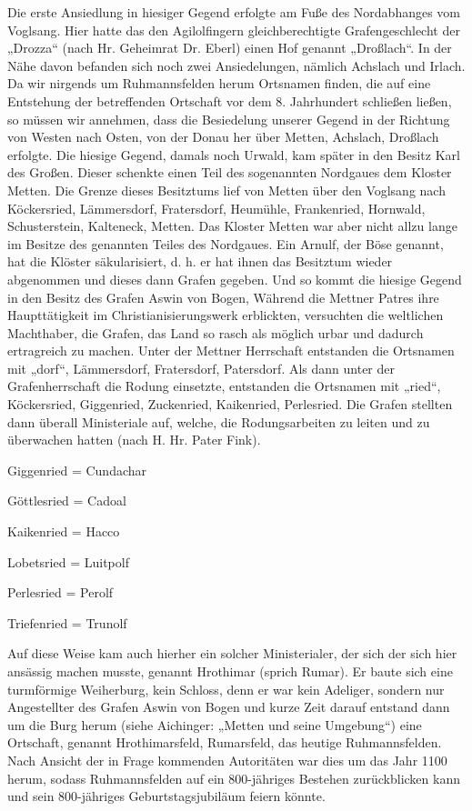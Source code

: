 \documentclass[12pt,a4paper]{book}
\begin{document}
Die erste Ansiedlung in hiesiger Gegend erfolgte am Fuße des Nordabhanges vom
Voglsang. Hier hatte das den Agilolfingern gleichberechtigte Grafengeschlecht
der „Drozza“ (nach Hr. Geheimrat Dr. Eberl) einen Hof genannt „Droßlach“. In der
Nähe davon befanden sich noch zwei Ansiedelungen, nämlich Achslach und Irlach.
Da wir nirgends um Ruhmannsfelden herum Ortsnamen finden, die auf eine
Entstehung der betreffenden Ortschaft vor dem 8. Jahrhundert schließen ließen,
so müssen wir annehmen, dass die Besiedelung unserer Gegend in der Richtung von
Westen nach Osten, von der Donau her über Metten, Achslach, Droßlach erfolgte.
Die hiesige Gegend, damals noch Urwald, kam später in den Besitz Karl des
Großen. Dieser schenkte einen Teil des sogenannten Nordgaues dem Kloster Metten.
Die Grenze dieses Besitztums lief von Metten über den Voglsang nach Köckersried,
Lämmersdorf, Fratersdorf, Heumühle, Frankenried, Hornwald, Schusterstein,
Kalteneck, Metten. Das Kloster Metten war aber nicht allzu lange im Besitze des
genannten Teiles des Nordgaues. Ein Arnulf, der Böse genannt, hat die Klöster
säkularisiert, d. h. er hat ihnen das Besitztum wieder abgenommen und dieses
dann Grafen gegeben. Und so kommt die hiesige Gegend in den Besitz des Grafen
Aswin von Bogen, Während die Mettner Patres ihre Haupttätigkeit im
Christianisierungswerk erblickten, versuchten die weltlichen Machthaber, die
Grafen, das Land so rasch als möglich urbar und dadurch ertragreich zu machen.
Unter der Mettner Herrschaft entstanden die Ortsnamen mit „dorf“, Lämmersdorf,
Fratersdorf, Patersdorf. Als dann unter der Grafenherrschaft die Rodung
einsetzte, entstanden die Ortsnamen mit „ried“, Köckersried, Giggenried,
Zuckenried, Kaikenried, Perlesried. Die Grafen stellten dann überall
Ministeriale auf, welche, die Rodungsarbeiten zu leiten und zu überwachen hatten
(nach H. Hr. Pater Fink).

Giggenried  = Cundachar

Göttlesried = Cadoal

Kaikenried = Hacco

Lobetsried = Luitpolf

Perlesried = Perolf

Triefenried = Trunolf

Auf diese Weise kam auch hierher ein solcher Ministerialer, der sich der sich
hier ansässig machen musste, genannt Hrothimar (sprich Rumar). Er baute sich
eine turmförmige Weiherburg, kein Schloss, denn er war kein Adeliger, sondern
nur Angestellter des Grafen Aswin von Bogen und kurze Zeit darauf entstand dann
um die Burg herum (siehe Aichinger: „Metten und seine Umgebung“) eine Ortschaft,
genannt Hrothimarsfeld, Rumarsfeld, das heutige Ruhmannsfelden. Nach Ansicht der
in Frage kommenden Autoritäten war dies um das Jahr 1100 herum, sodass
Ruhmannsfelden auf ein 800-jähriges Bestehen zurückblicken kann und sein
800-jähriges Geburtstagsjubiläum feiern könnte.
\end{document}
